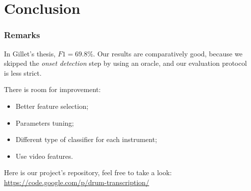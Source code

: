 \documentclass{beamer}
\begin{document}
    \section{Conclusion}
    \begin{frame}
        \frametitle{Remarks}
        In Gillet's thesis, $F1=69.8\%$.
        Our results are comparatively good, because we skipped the \emph{onset detection} step by using an oracle, and our evaluation protocol is less strict.
        \vspace{0.5cm}
        
        There is room for improvement:
        \begin{itemize}
        \item Better feature selection;
        \item Parameters tuning;
        \item Different type of classifier for each instrument;
        \item Use video features.
        \end{itemize}
        \vspace{0.5cm}

        Here is our project's repository, feel free to take a look: \url{https://code.google.com/p/drum-transcription/}
    \end{frame}
\end{document}
